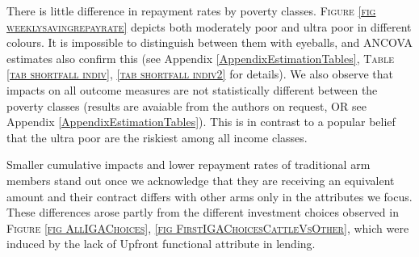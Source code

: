 	There is little difference in repayment rates by poverty classes. \textsc{\footnotesize Figure \ref{fig weeklysavingrepayrate}} depicts both moderately poor and ultra poor in different colours. It is impossible to distinguish between them with eyeballs, and ANCOVA estimates also confirm this  (see Appendix \ref{AppendixEstimationTables}, \textsc{\small Table \ref{tab shortfall indiv}, \ref{tab shortfall indiv2}} for details). We also observe that impacts on all outcome measures are not statistically different between the poverty classes (results are avaiable from the authors on request, OR see Appendix \ref{AppendixEstimationTables}). This is in contrast to a popular belief that the ultra poor are the riskiest among all income classes. %

	Smaller cumulative impacts and lower repayment rates of \textsf{traditional} arm members stand out once we acknowledge that they are receiving an equivalent amount and their contract differs with other arms only in the attributes we focus. These differences arose partly from the different investment choices observed in \textsc{\small Figure \ref{fig AllIGAChoices}, \ref{fig FirstIGAChoicesCattleVsOther}}, which were induced by the lack of \textsf{Upfront} functional attribute in lending.
	
